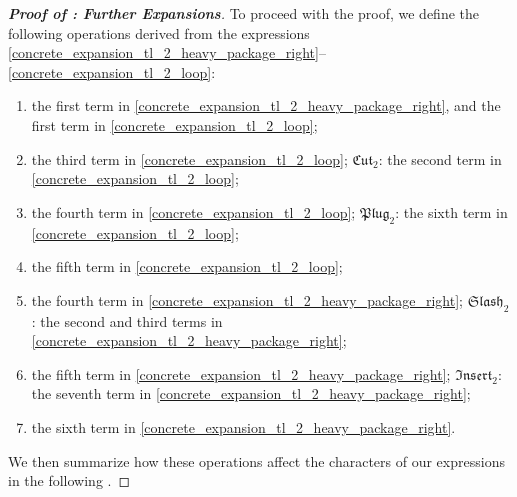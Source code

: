 \documentclass[10pt,reqno]{amsart}
\numberwithin{equation}{section}
\numberwithin{figure}{section}
\theoremstyle{plain} %
\theoremstyle{definition} %
\newcommand{\freplace}{\mathfrak{Replace}}
\newcommand{\fcut}[1]{\mathfrak{Cut}_{#1}}
\newcommand{\fplug}[1]{\mathfrak{Plug}_{#1}}
\newcommand{\finsert}[1]{\mathfrak{Insert}_{#1}}
\newcommand{\fexchange}{\mathfrak{Exchange}}
\newcommand{\fmerge}{\mathfrak{Merge}}
\newcommand{\fslash}[1]{\mathfrak{Slash}_{#1}}
\numberwithin{equation}{section}
\begin{document}
\begin{proof}[\bf Proof of : Further Expansions]
    To proceed with the proof, we define the following operations derived from the expressions \eqref{concrete_expansion_tl_2_heavy_package_right}--\eqref{concrete_expansion_tl_2_loop}:
    \begin{enumerate}\centering
        \item[$\freplace$:] the first term in \eqref{concrete_expansion_tl_2_heavy_package_right}, and the first term in \eqref{concrete_expansion_tl_2_loop};
        \item[$\fcut{1}$:] the third term in \eqref{concrete_expansion_tl_2_loop};
        \quad $\fcut{2}$: the second term in \eqref{concrete_expansion_tl_2_loop};
        \item[$\fplug{1}$:] the fourth  term in \eqref{concrete_expansion_tl_2_loop};
        \quad$\fplug{2}$: the sixth term in \eqref{concrete_expansion_tl_2_loop};
        \item[$\fmerge$:] the fifth term in \eqref{concrete_expansion_tl_2_loop};
        \item[$\fslash{1}$:] the fourth term in \eqref{concrete_expansion_tl_2_heavy_package_right};
        \quad$\fslash{2}$: the second and third terms in \eqref{concrete_expansion_tl_2_heavy_package_right};
        \item[$\finsert{1}$:] the fifth term in \eqref{concrete_expansion_tl_2_heavy_package_right};
        \quad$\finsert{2}$: the seventh term in \eqref{concrete_expansion_tl_2_heavy_package_right};
        \item[$\fexchange$:] the sixth term in \eqref{concrete_expansion_tl_2_heavy_package_right}.
    \end{enumerate}
We then summarize how these operations affect the characters of our expressions in the following .


\end{proof}
\end{document}
